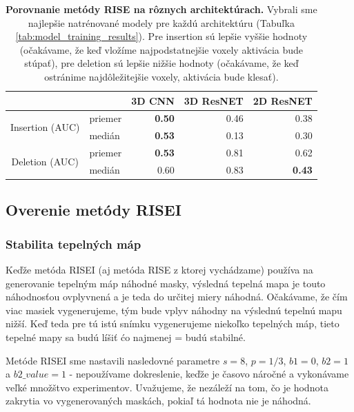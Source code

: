 \begin{table}[]
    \centering
    \begin{tabular}{cl|r|r|r|}
        \cline{3-5}
        \multicolumn{1}{l}{} &  & \multicolumn{1}{c|}{3D CNN} & \multicolumn{1}{c|}{3D ResNET} & \multicolumn{1}{c|}{2D ResNET} \\ \hline
        \multicolumn{1}{|c|}{\multirow{2}{*}{Insertion (AUC)}} & priemer & \textbf{0.50} & 0.46 & 0.38 \\ \cline{2-2}
        \multicolumn{1}{|c|}{}                                 & medián  & \textbf{0.53} & 0.13 & 0.30 \\ \cline{1-2}
        \multicolumn{1}{|c|}{\multirow{2}{*}{Deletion (AUC)}}  & priemer & \textbf{0.53} & 0.81 & 0.62 \\ \cline{2-2}
        \multicolumn{1}{|c|}{}                                 & medián  & 0.60 & 0.83 & \textbf{0.43} \\ \hline
    \end{tabular}
    \caption{\textbf{Porovnanie metódy RISE na rôznych architektúrach.} Vybrali sme najlepšie natrénované modely pre každú architektúru (Tabuľka \ref{tab:model_training_results}). Pre insertion sú lepšie vyššie hodnoty (očakávame, že keď vložíme najpodstatnejšie voxely aktivácia bude stúpať), pre deletion sú lepšie nižšie hodnoty (očakávame, že keď ostránime najdôležitejšie voxely, aktivácia bude klesať).}
    \label{tab:experiment_rise_various_architectures}
\end{table}

\subsection{Overenie metódy RISEI}

\subsubsection{Stabilita tepelných máp \label{sec:risei_stability}}

Keďže metóda RISEI (aj metóda RISE z ktorej vychádzame) používa na generovanie tepelným máp náhodné masky, výsledná tepelná mapa je touto náhodnosťou ovplyvnená a je teda do určitej miery náhodná. Očakávame, že čím viac masiek vygenerujeme, tým bude vplyv náhodny na výslednú tepelnú mapu nižší. Keď teda pre tú istú snímku vygenerujeme niekoľko tepelných máp, tieto tepelné mapy sa budú líšiť ćo najmenej = budú stabilné.

Metóde RISEI sme nastavili nasledovné parametre $s = 8$, $p = 1/3$, $b1 = 0$, $b2 = 1$ a $b2\_value = 1$ - nepoužívame dokreslenie, keďže je časovo náročné a vykonávame veľké množštvo experimentov. Uvažujeme, že nezáleží na tom, čo je hodnota zakrytia vo vygenerovaných maskách, pokiaľ tá hodnota nie je náhodná.

